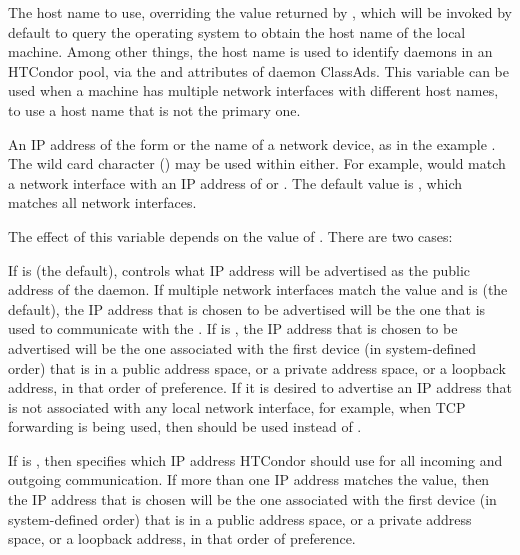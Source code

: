 \begin{description}
\label{param:NetworkHostname}
\item[\Macro{NETWORK\_HOSTNAME}]
The host name to use,
overriding the value returned by
, which will be invoked by default
to query the operating system to obtain the host name of the local machine. 
Among other things, the host name is used to identify daemons in
an HTCondor pool, via the  and  attributes of 
daemon ClassAds.
This variable can be used when a machine has multiple network interfaces
with different host names, 
to use a host name that is not the primary one.

\label{param:NetworkInterface}
\item[\Macro{NETWORK\_INTERFACE}]
  An IP address of the form  or the name
  of a network device, as in the example .
  The wild card character (\Expr{*}) may be used within either.
  For example,  would match a network interface
  with an IP address of  or .
  The default value is \Expr{*}, which matches all network interfaces.

  The effect of this variable depends on the value of
  .  There are two cases:

  If  is  (the default),
   controls what IP address
  will be advertised as the public address of the daemon.  
  If multiple network interfaces match the value and
   is  (the default),
  the IP address that is chosen to be advertised will be the one that
  is used to communicate with the .
  If  is , the IP address
  that is chosen to be advertised will be the one associated with the
  first device (in system-defined order) that is in a public address
  space, or a private address space, or a loopback address, in that
  order of preference.  
  If it is desired to advertise an IP address
  that is not associated with any local network interface, 
  for example, when TCP forwarding is being used,
  then  should be used instead of
  .

  If  is ,
  then  specifies which IP address HTCondor
  should use for all incoming and outgoing communication.
  If more than one IP address matches the value, 
  then the IP address that is
  chosen will be the one associated with the first device (in
  system-defined order) that is in a public address space, or a
  private address space, or a loopback address, in that order of
  preference.


\end{description}
